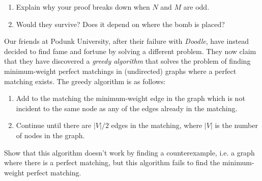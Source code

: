 \documentclass[twoside,12pt]{article}
\begin{document}
\begin{problem}[20 points]
\begin{enumerate}
{Checking that it is a Hamiltonian cycle is routine.


Drawing the above path on an actual grid is very enlightening.

}

\item Explain why your proof breaks down when $N$ and
$M$ are odd.
\item
Would they survive? Does it depend on where the bomb is placed?
\end{enumerate}


\eparts


\end{problem}


\begin{problem}[10 points]
Our friends at Podunk University, after their failure with
\emph{Doodle}, have instead decided to find fame and fortune by
solving a different problem. They now claim that they have
discovered a \emph{greedy algorithm} that solves the problem of
finding minimum-weight perfect matchings in (undirected) graphs
where a perfect matching exists. The greedy algorithm is as follows:
\begin{enumerate}
\item Add to the matching the minimum-weight edge in the graph which
is not incident to the same node as any of the edges already in the
matching.
\item Continue until there are $|V|/2$ edges in the matching,
where $|V|$ is the number of nodes in the graph.
\end{enumerate}

Show that this algorithm doesn't work by finding a counterexample,
i.e. a graph where there is a perfect matching, but this algorithm
fails to find the minimum-weight perfect matching.


\end{problem}
\end{document}
